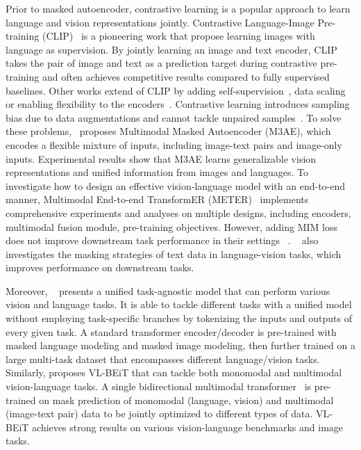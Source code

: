 \documentclass[10pt,journal,compsoc]{IEEEtran}
\newcommand{\CS}[1]{\textcolor{red}{[CS: #1]}}
\begin{document}
Prior to masked autoencoder, contrastive learning is a popular approach to learn language and vision representations jointly. Contrastive Language-Image Pre-training (CLIP)~\cite{radford2021learning} is a pioneering work that propose learning images with language as supervision. By jointly learning an image and text encoder, CLIP takes the pair of image and text as a prediction target during contrastive pre-training and often achieves competitive results compared to fully supervised baselines. Other works extend of CLIP by adding self-supervision~\cite{mu2021slip}, data scaling~\cite{jia2021scaling} or enabling flexibility to the encoders~\cite{bao2022vlmo}.
Contrastive learning introduces sampling bias due to data augmentations and cannot tackle unpaired samples~\cite{geng2022multimodal}. To solve these problems,~\cite{geng2022multimodal} proposes Multimodal Masked Autoencoder (M3AE), which encodes a flexible mixture of inputs, including image-text pairs and image-only inputs. Experimental results show that  M3AE learns generalizable vision representations and unified information from images and languages. 
To investigate how to design an effective vision-language model with an end-to-end manner, Multimodal End-to-end TransformER (METER)~\cite{dou2022empirical} implements comprehensive experiments and analyses on multiple designs, including encoders, multimodal fusion module, pre-training objectives. However, adding MIM loss does not improve downstream task performance in their settings ~\cite{dou2022empirical}. ~\cite{bitton2021data} also investigates the masking strategies of text data in language-vision tasks, which improves performance on downstream tasks.

Moreover, ~\cite{lu2022unified} presents a unified task-agnostic model that can perform various vision and language tasks. It is able to tackle different tasks with a unified model without employing task-specific branches by tokenizing the inputs and outputs of every given task. A standard transformer encoder/decoder is pre-trained with masked language modeling and masked image modeling, then further trained on a large multi-task dataset that encompasses different language/vision tasks. 
Similarly, \cite{bao2022vl} proposes VL-BEiT that can tackle both monomodal and multimodal vision-language tasks. A single bidirectional multimodal transformer~\cite{bao2022vlmo} is pre-trained on mask prediction of monomodal (language, vision) and multimodal (image-text pair) data to be jointly optimized to different types of data. VL-BEiT achieves strong results on various vision-language benchmarks and image tasks. 
\end{document}
